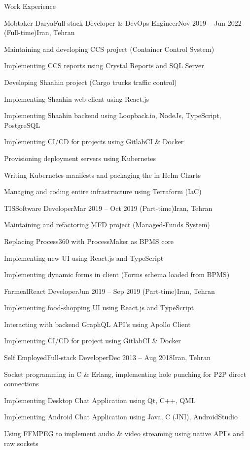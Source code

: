 \documentclass[]{main}
\begin{document}
\begin{section}{Work Experience}
 \begin{subsection}{Mobtaker Darya}{Full-stack Developer \& DevOps Engineer}{Nov 2019 -- Jun 2022 (Full-time)}{Iran, Tehran}
     \item Maintaining and developing CCS project (Container Control System)
     \item Implementing CCS reports using Crystal Reports and SQL Server
     \item Developing Shaahin project (Cargo trucks traffic control)
     \item Implementing Shaahin web client using React.js
     \item Implementing Shaahin backend using Loopback.io, NodeJs, TypeScript, PostgreSQL
     \item Implementing CI/CD for projects using GitlabCI \& Docker
     \item Provisioning deployment servers using Kubernetes
     \item Writing Kubernetes manifests and packaging the in Helm Charts
     \item Managing and coding entire infrastructure using Terraform (IaC)
 \end{subsection}

 \begin{subsection}{TIS}{Software Developer}{Mar 2019 -- Oct 2019 (Part-time)}{Iran, Tehran}
     \item Maintaining and refactoring MFD project (Managed-Funds System)
     \item Replacing Process360 with ProcessMaker as BPMS core
     \item Implementing new UI using React.js and TypeScript
     \item Implementing dynamic forms in client (Forms schema loaded from BPMS)
 \end{subsection}

 \begin{subsection}{Farmeal}{React Developer}{Jun 2019 -- Sep 2019 (Part-time)}{Iran, Tehran}
     \item Implementing food-shopping UI using React.js and TypeScript
     \item Interacting with backend GraphQL API's using Apollo Client
     \item Implementing CI/CD for project using GitlabCI \& Docker
 \end{subsection}

 \begin{subsection}{Self Employed}{Full-stack Developer}{Dec 2013 -- Aug 2018}{Iran, Tehran}
     \item Socket programming in C \& Erlang, implementing hole punching for P2P direct connections
     \item Implementing Desktop Chat Application using Qt, C++, QML
     \item Implementing Android Chat Application using Java, C (JNI), AndroidStudio
     \item Using FFMPEG to implement audio \& video streaming using native API's and raw sockets
 \end{subsection}
\end{section}
\end{document}
